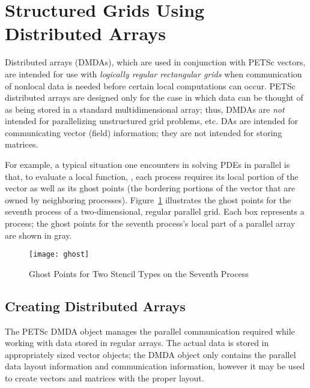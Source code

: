 \section{Structured Grids Using Distributed Arrays}
\label{sec_da} \label{sec_struct}

  Distributed arrays (DMDAs), which are used in
conjunction with PETSc vectors, are intended for use with {\em
logically regular rectangular grids} when communication of nonlocal data is
needed before certain local computations can occur.  PETSc distributed
arrays are designed only for the case in which data can be thought of
as being stored in a standard multidimensional array; thus, DMDAs
are {\em not} intended for parallelizing unstructured grid problems, etc.
DAs are intended for communicating vector (field) information; they
are not intended for storing matrices.

For example, a typical situation one encounters in solving
PDEs in parallel is that, to evaluate a local function, , each process
requires its local portion of the vector  as well as its ghost
points  (the bordering portions of the vector
that are owned by neighboring processes).  Figure~\ref{fig_ghosts}
illustrates the ghost points for the seventh process of a
two-dimensional, regular parallel grid.  Each box represents a
process; the ghost points for the seventh process's local part of
a parallel array are shown in gray.

\begin{figure}[tb]
\centerline{ \texttt{[image: ghost]}}
\caption{Ghost Points for Two Stencil Types on the Seventh Process}
\label{fig_ghosts}
\end{figure}

\subsection{Creating Distributed Arrays}

The PETSc DMDA object manages the parallel communication required
while working with data stored in regular arrays. The actual data
is stored in appropriately sized vector objects; the DMDA object
only contains the parallel data layout information and communication
information, however it may be used to create vectors and matrices with the
proper layout.


